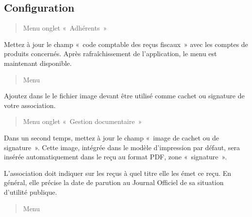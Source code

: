 \documentclass[a4paper,10pt,oneside,french]{sphinxmanual}
\begin{document}
\subsection{Configuration}
\label{\detokenize{member/taxreceipt:configuration}}
\sphinxAtStartPar
{}
\begin{quote}

\sphinxAtStartPar
Menu  \sphinxhyphen{} onglet « Adhérents »
\end{quote}

\sphinxAtStartPar
Mettez à jour le champ « code comptable des reçus fiscaux » avec les comptes de produits concernés.
Après rafraîchissement de l’application, le menu  est maintenant disponible.

\sphinxAtStartPar
{}
\begin{quote}

\sphinxAtStartPar
Menu 
\end{quote}

\sphinxAtStartPar
Ajoutez dans le  le fichier image devant être utilisé comme cachet ou signature de votre association.
\begin{quote}

\sphinxAtStartPar
Menu  \sphinxhyphen{} onglet « Gestion documentaire »
\end{quote}

\sphinxAtStartPar
Dans un second temps, mettez à jour le champ « image de cachet ou de signature ».
Cette image, intégrée dans le modèle d’impression par défaut, sera insérée automatiquement dans le reçu au format PDF, zone « signature ».

\sphinxAtStartPar
{}

\sphinxAtStartPar
L’association doit indiquer sur les reçus à quel titre elle les émet ce reçu.
En général, elle précise la date de parution au Journal Officiel de sa situation d’utilité publique.
\begin{quote}

\sphinxAtStartPar
Menu 
\end{quote}
\end{document}
